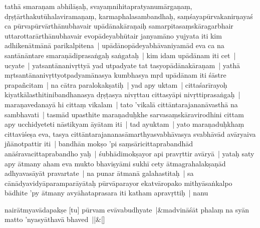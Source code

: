 \documentclass[article,12pt,a4paper]{memoir}%
\newcounter{parCount}
\begin{document}
	  \pstart \leavevmode%
	\label{thakur75-127.10}tathā smaraṇam abhilāṣaḥ, svayaṃnihitapratyanumārgaṇaṃ, dṛṣṭārthakutūhalaviramaṇaṃ, karmaphalasambandhaḥ, saṃśayapūrvakanirṇayaś ca pūrvapūrvārthānubhavair upādānakāraṇaiḥ samarpitasaṃskāragarbhair uttarottarārthānubhavair evopādeyabhūtair janyamāno yujyata iti kim adhikenātmānā parikalpitena | \label{thakur75-127.13} upādānopādeyabhāvaniyamād eva ca na santānāntare smaraṇādiprasaṅgaḥ saṅgataḥ | kim idam upādānam iti cet | \label{thakur75-127.14} ucyate | yatsantānanivṛttyā yad utpadyate tat tasyopādānakāraṇam | yathā mṛtsantānanivṛttyotpadyamānasya kumbhasya mṛd upādānam iti śāstre prapañcitam | na cātra paralokakṣatiḥ | \label{thakur75-127.17} yad apy uktam | cittaśarīrayoḥ kiyatkālasthitinibandhanasya dṛṣṭasya nivṛttau cittasyāpi nivṛttiprasaṅgaḥ | maraṇavedanayā hi cittaṃ vikalam | tato 'vikalā cittāntarajananāvasthā na sambhavati | tasmād upasthite maraṇaduḥkhe sarvasaṃskāravirodhini cittam apy ucchidyeteti nāstikyam āyātam iti | \label{thakur75-127.20} tad ayuktam | yato maraṇaduḥkhaṃ cittaviśeṣa eva, tasya cittāntarajananasāmarthyasvabhāvasya svabhāvād avāryaiva jñānotpattir iti | \label{thakur75-127.22} bandhān mokṣo 'pi saṃsāricittaprabandhād anāśravacittaprabandho yaḥ | \label{thakur75-127.23} śubhādimokṣayor api pravṛttir avāryā | yataḥ saty apy ātmany aham eva mukto bhaviṣyāmi sukhī cety ātmagrahalakṣaṇād adhyavasāyāt pravartate | na punar ātmanā galahastitaḥ | sa cānādyavidyāparamparāyātaḥ pūrvāparayor ekatvāropako mithyāsaṅkalpo bādhite 'py ātmany avyāhataprasara iti katham apravṛttiḥ | \label{thakur75-127.26} nanu
	{}
	\pend%
      
	    
	    \stanza[\smallbreak]
	  nairātmyavādapakṣe [tu] pūrvam evāvabudhyate |&madvināśāt phalaṃ na syān matto 'nyasyāthavā bhaved ||\&[\smallbreak]
	  
	  
	  
\end{document}
